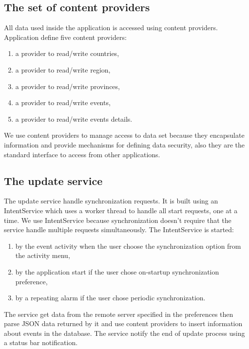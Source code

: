 \documentclass[12pt, twoside]{article}
\begin{document}
\subsection{The set of content providers}

All data used inside the application is accessed using content providers. Application define five content providers:
\begin{enumerate}
	\item a provider to read/write countries,
	\item a provider to read/write region,
	\item a provider to read/write provinces,
	\item a provider to read/write events,
	\item a provider to read/write events details.
\end{enumerate}

We use content providers to manage access to data set because they encapsulate information and provide mechanisms for defining data security, also they are the standard interface to access from other applications.

\subsection{The update service}

The update service handle synchronization requests.
It is built using an IntentService which uses a worker thread to handle all start requests, one at a time.
We use IntentService because synchronization doesn't require that the service handle multiple requests simultaneously.
The IntentService is started:
\begin{enumerate}
	\item by the event activity when the user choose the synchronization option from the activity menu,
	\item	by the application start if the user chose on-startup synchronization preference,
	\item by a repeating alarm if the user chose periodic synchronization.
\end{enumerate}

The service get data from the remote server specified in the preferences then parse JSON data returned by it and use content providers to insert information about events in the database.
The service notify the end of update process using a status bar notification.
\end{document}
